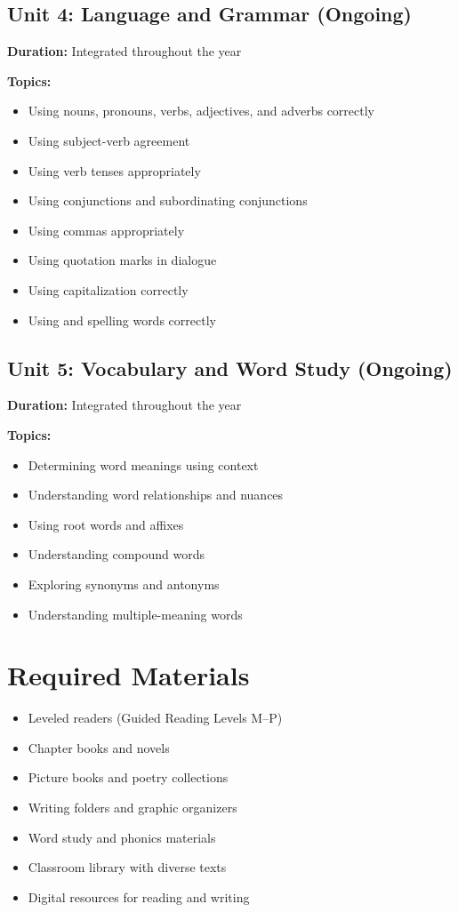 \documentclass[11pt,letterpaper]{report}
\begin{document}
\subsection{Unit 4: Language and Grammar (Ongoing)}

\textbf{Duration:} Integrated throughout the year

\textbf{Topics:}
\begin{itemize}
    \item Using nouns, pronouns, verbs, adjectives, and adverbs correctly
    \item Using subject-verb agreement
    \item Using verb tenses appropriately
    \item Using conjunctions and subordinating conjunctions
    \item Using commas appropriately
    \item Using quotation marks in dialogue
    \item Using capitalization correctly
    \item Using and spelling words correctly
\end{itemize}

\subsection{Unit 5: Vocabulary and Word Study (Ongoing)}

\textbf{Duration:} Integrated throughout the year

\textbf{Topics:}
\begin{itemize}
    \item Determining word meanings using context
    \item Understanding word relationships and nuances
    \item Using root words and affixes
    \item Understanding compound words
    \item Exploring synonyms and antonyms
    \item Understanding multiple-meaning words
\end{itemize}

\section{Required Materials}

\begin{itemize}
    \item Leveled readers (Guided Reading Levels M--P)
    \item Chapter books and novels
    \item Picture books and poetry collections
    \item Writing folders and graphic organizers
    \item Word study and phonics materials
    \item Classroom library with diverse texts
    \item Digital resources for reading and writing
\end{itemize}
\end{document}

